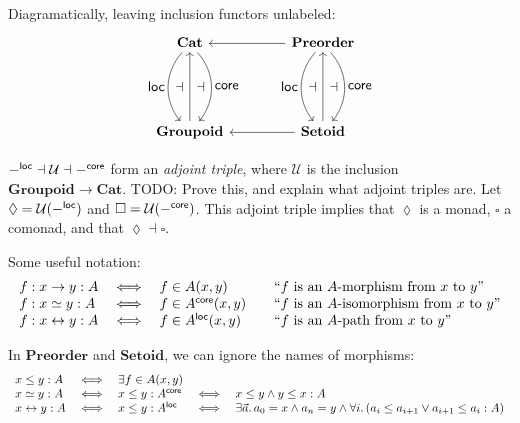 \documentclass{article}
\newcommand{\todo}[1]{{\color{red}#1}}
\newcommand{\mb}[1]{\ensuremath{\mathbf{#1}}}
\newcommand{\mc}[1]{\ensuremath{\mathcal{#1}}}
\newcommand{\binder}{.\,}
\newcommand{\bind}[1]{{#1}\binder}
\begin{document}
Diagramatically, leaving inclusion functors unlabeled:
{\large\[
  \tikzset{
    no line/.style={draw=none,
      commutative diagrams/every label/.append style={/tikz/auto=false}}}
  \begin{tikzcd}[row sep=5em,column sep=4em]
    \mb{Cat}
    \arrow[d,bend right=40,"\textstyle\loc"'{name=A}]
    \arrow[d,bend left=40,"\textstyle\core"{name=C}]
    & \mb{Preorder}
    \arrow[d,bend right=40,"\textstyle\loc"'{name=A2}]
    \arrow[d,bend left=40,"\textstyle\core"{name=C2}]
    \arrow[l]
    \\
    \mb{Groupoid} \arrow[u,""{name=B}]
    & \mb{Setoid} \arrow{u}[name=B2]{} \arrow[l]
    \arrow[to path={(A) -- (B)\tikztonodes}, no line, near end]{}{\displaystyle\dashv}
    \arrow[to path={(B) -- (C)\tikztonodes}, no line]{}{\displaystyle\dashv}
    \arrow[to path={(A2) -- (B2)\tikztonodes}, no line, near end]{}{\displaystyle\dashv}
    \arrow[to path={(B2) -- (C2)\tikztonodes}, no line]{}{\displaystyle\dashv}
  \end{tikzcd}
\]}

$-^\loc \dashv \mc{U} \dashv -^\core$ form an \emph{adjoint triple}, where
$\mc{U}$ is the inclusion $\mb{Groupoid} \to \mb{Cat}$. \todo{TODO:
  Prove this, and explain what adjoint triples are.}
%
Let $\lozenge = \mc{U}(-^\loc)$ and $\square = \mc{U}(-^\core)$. This adjoint
triple implies that $\lozenge$ is a monad, $\square$ a comonad, and that
$\lozenge \dashv \square$.

Some useful notation:
\[\begin{array}{lcl@{\hskip 2em}l}
  f : x \to y : A &\iff& f \in A(x,y)
  & \text{``$f$ is an $A$-morphism from $x$ to $y$''}\\
  f : x \simeq y : A &\iff& f \in A^\core(x,y)
  & \text{``$f$ is an $A$-isomorphism from $x$ to $y$''}\\
  f : x \pth y : A &\iff& f \in A^\loc(x,y)
  & \text{``$f$ is an $A$-path from $x$ to $y$''}
\end{array}\]

In $\mb{Preorder}$ and $\mb{Setoid}$, we can ignore the names of morphisms:
\[\begin{array}{lclcl}
  x \le y : A &\iff& \exists f \in A(x,y)\\
  x \iso y : A &\iff& x \le y : A^\core &\iff& x \le y \wedge y \le x : A\\
  x \pth y : A &\iff& x \le y : A^\loc
  &\iff& \exists\bind{\vec{a}} a_0 = x \wedge a_n = y
  \wedge \forall\bind{i} (a_i \le a_{i+1} \vee a_{i+1} \le a_i : A)
\end{array}\]
\end{document}
